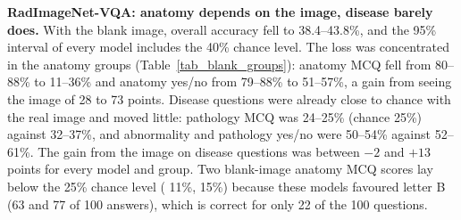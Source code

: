 {\color{blue}
\textbf{RadImageNet-VQA: anatomy depends on the image, disease barely does.} With the blank image, overall accuracy fell to 38.4--43.8\%, and the 95\% interval of every model includes the 40\% chance level. The loss was concentrated in the anatomy groups (Table~\ref{tab_blank_groups}): anatomy MCQ fell from 80--88\% to 11--36\% and anatomy yes/no from 79--88\% to 51--57\%, a gain from seeing the image of 28 to 73 points. Disease questions were already close to chance with the real image and moved little: pathology MCQ was 24--25\% (chance 25\%) against 32--37\%, and abnormality and pathology yes/no were 50--54\% against 52--61\%. The gain from the image on disease questions was between $-2$ and $+13$ points for every model and group. Two blank-image anatomy MCQ scores lay below the 25\% chance level (\gemma{} 11\%, \medgemma{} 15\%) because these models favoured letter B (63 and 77 of 100 answers), which is correct for only 22 of the 100 questions.
}

\begin{table}[tb]
\color{blue}
\centering
\caption{RadImageNet-VQA accuracy (\%) by group, real $\rightarrow$ blank image (100 questions per group; chance 25\% for MCQ and 50\% for yes/no).}
\label{tab_blank_groups}
\footnotesize
\setlength{\tabcolsep}{3pt}
\end{table}

